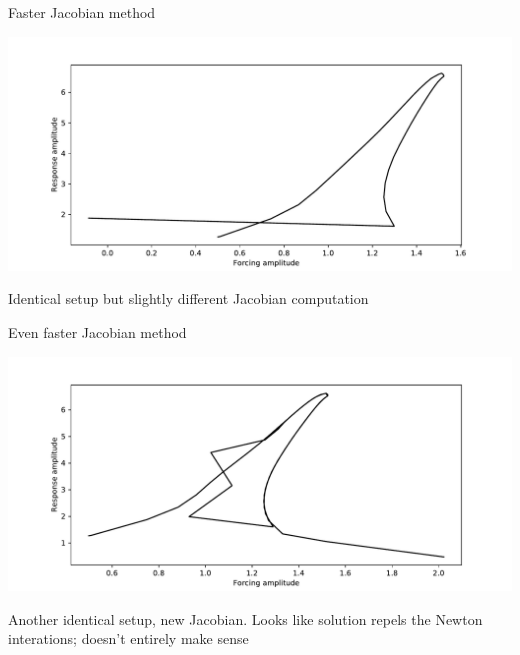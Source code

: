 \documentclass[presentation]{beamer}
\begin{document}
\begin{frame}[label={sec:org03425a6}]{Faster Jacobian method}
\begin{center}
\includegraphics[width=.9\linewidth]{./kp1_transtime100_newton.pdf}
\end{center}

Identical setup but slightly different Jacobian computation
\end{frame}

\begin{frame}[label={sec:orgb48b033}]{Even faster Jacobian method}
\begin{center}
\includegraphics[width=.9\linewidth]{./nonadaptive_onestep-newton_dsize5_my_jacobian_fdss_0d2_stepsize1.pdf}
\end{center}

Another identical setup, new Jacobian. Looks like solution repels the Newton interations; doesn't entirely make sense
\end{frame}
\end{document}
